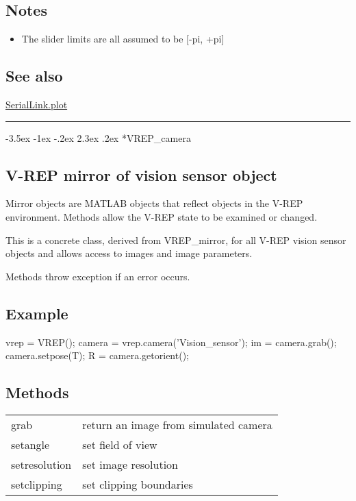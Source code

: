 \documentclass[a4paper]{article}
\makeatletter
\renewcommand\section{%
\@startsection{section}{1}{\z@}%
  {-3.5ex \@plus -1ex \@minus -.2ex}%
  {2.3ex \@plus.2ex}%
  {\color{red}\sffamily\huge\bfseries}}
\makeatother
\begin{document}
\subsection*{Notes}
\begin{itemize}
  \item The slider limits are all assumed to be [-pi, +pi]
\end{itemize}
\subsection*{See also}


\hyperlink{SerialLink.plot}{\color{blue} SerialLink.plot}

\vspace{1.5ex}\rule{\textwidth}{1mm}

\hypertarget{VREP\_camera}{\section*{VREP\_camera}}
\subsection*{V-REP mirror of vision sensor object}
Mirror objects are MATLAB objects that reflect objects in the V-REP
environment.  Methods allow the V-REP state to be examined or changed.

This is a concrete class, derived from VREP\_mirror, for all V-REP vision
sensor objects and allows access to images and image parameters.

Methods throw exception if an error occurs.

\subsection*{Example}
\begin{Code}
vrep = VREP();
camera = vrep.camera('Vision_sensor');
im = camera.grab();
camera.setpose(T);
R = camera.getorient();
\end{Code}
\subsection*{Methods}
\begin{tabular}{lp{120mm}}
 grab & return an image from simulated camera\\ 
 setangle & set field of view\\ 
 setresolution & set image resolution\\ 
 setclipping & set clipping boundaries\\ 
\end{tabular}\vspace{1ex}
\end{document}
